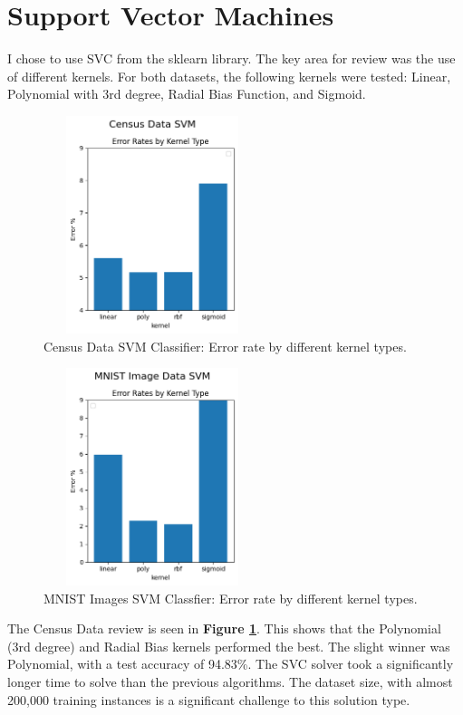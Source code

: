 \documentclass[letterpaper]{article} %
\begin{document}
\section{Support Vector Machines}

I chose to use SVC from the sklearn library.  The key area for review was the use of different kernels.  For both datasets, the following kernels were tested: Linear, Polynomial with 3rd degree, Radial Bias Function, and Sigmoid.

\begin{figure}[h]
\centering
\includegraphics[width=2.5in, height=2.5in]{figures/Census_Data_SVM_svm_1.png}
\caption{Census Data SVM Classifier:  Error rate by different kernel types.  }
\label{fig:svm_census_1}
\end{figure}

\begin{figure}[h]
\centering
\includegraphics[width=2.5in, height=2.5in]{figures/MNIST_Image_Data_SVM_svm_1.png}
\caption{MNIST Images SVM Classfier:  Error rate by different kernel types.  }
\label{fig:svm_mnist_1}
\end{figure}

The Census Data review is seen in \textbf{Figure \ref{fig:svm_census_1}}.  This shows that the Polynomial (3rd degree) and Radial Bias kernels performed the best.  The slight winner was Polynomial, with a test accuracy of  94.83\%.  The SVC solver took a significantly longer time to solve than the previous algorithms.  The dataset size, with almost 200,000 training instances is a significant challenge to this solution type.
\end{document}
